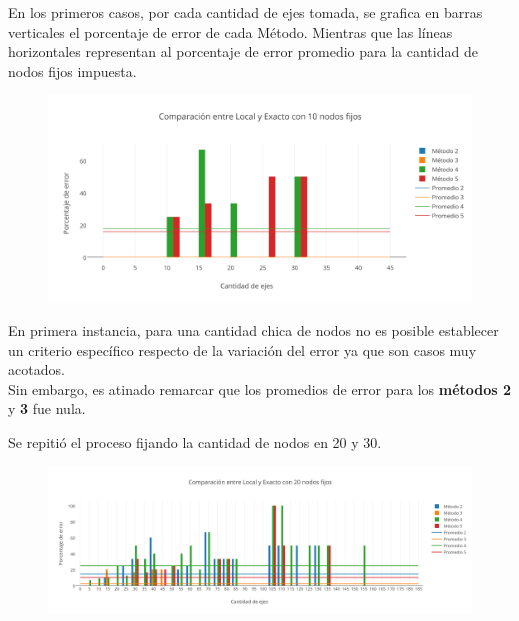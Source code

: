 \bigskip

En los primeros casos, por cada cantidad de ejes tomada, se grafica en barras verticales el porcentaje de error de cada M\'etodo. Mientras que las l\'ineas horizontales representan al porcentaje de error promedio para la cantidad de nodos fijos impuesta.


  \begin{figure}[h!]
   \begin{center}
 	\includegraphics[scale=0.75]{imagenes/local/exacto/10nodos.png}
   \end{center}
 \end{figure}

En primera instancia, para una cantidad chica de nodos no es posible establecer un criterio específico respecto de la variación del error ya que son casos muy acotados.\\

Sin embargo, es atinado remarcar que los promedios de error para los \textbf{métodos 2} y \textbf{3} fue nula.

\newpage

Se repitió el proceso fijando la cantidad de nodos en 20 y 30.

  \begin{figure}[h!]
   \begin{center}
 	\includegraphics[scale=0.55]{imagenes/local/exacto/20nodos.png}
   \end{center}
 \end{figure}
 
